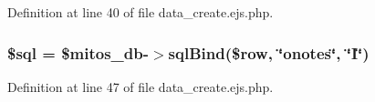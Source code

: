 \-Definition at line 40 of file data\-\_\-create.\-ejs.\-php.

\hypertarget{miscellaneous_2officenotes_2data__create_8ejs_8php_a047170d6020a882807665812a27e2525}{
\subsubsection[{\$sql}]{\setlength{\rightskip}{0pt plus 5cm}\$sql = \$mitos\-\_\-db-\/$>$sql\-Bind(\$row, \char`\"{}onotes\char`\"{}, \char`\"{}\-I\char`\"{})}}\label{miscellaneous_2officenotes_2data__create_8ejs_8php_a047170d6020a882807665812a27e2525}


\-Definition at line 47 of file data\-\_\-create.\-ejs.\-php.

